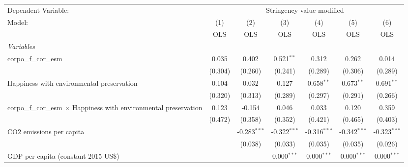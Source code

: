
\begingroup
\centering
\begin{tabular}{lcccccc}
   \toprule
   Dependent Variable: & \multicolumn{6}{c}{Stringency value modified}\\
   Model:                                                                    & (1)     & (2)            & (3)            & (4)            & (5)            & (6)\\  
                                                                             &  OLS    & OLS            & OLS            & OLS            & OLS            & OLS\\  
   \midrule
   \emph{Variables}\\
   corpo\_f\_cor\_esm                                                        & 0.035   & 0.402          & 0.521$^{**}$   & 0.312          & 0.262          & 0.014\\   
                                                                             & (0.304) & (0.260)        & (0.241)        & (0.289)        & (0.306)        & (0.289)\\   
   Happiness with environmental preservation                                 & 0.104   & 0.032          & 0.127          & 0.658$^{**}$   & 0.673$^{**}$   & 0.691$^{**}$\\   
                                                                             & (0.320) & (0.313)        & (0.289)        & (0.297)        & (0.291)        & (0.266)\\   
   corpo\_f\_cor\_esm $\times$ Happiness with environmental preservation     & 0.123   & -0.154         & 0.046          & 0.033          & 0.120          & 0.359\\   
                                                                             & (0.472) & (0.358)        & (0.352)        & (0.421)        & (0.465)        & (0.403)\\   
   CO2 emissions per capita                                                  &         & -0.283$^{***}$ & -0.322$^{***}$ & -0.316$^{***}$ & -0.342$^{***}$ & -0.323$^{***}$\\   
                                                                             &         & (0.038)        & (0.033)        & (0.035)        & (0.035)        & (0.026)\\   
   GDP per capita (constant 2015 US\$)                                       &         &                & 0.000$^{***}$  & 0.000$^{***}$  & 0.000$^{***}$  & 0.000$^{***}$\\   

\end{tabular}
